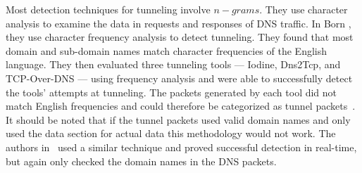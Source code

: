 Most detection techniques for tunneling involve $n-grams$.
They use character analysis to examine the data in requests and responses of DNS traffic.
In Born \etal{}, they use character frequency analysis to detect tunneling.
They found that most domain and sub-domain names match character frequencies of the English language.
They then evaluated three tunneling tools --- Iodine, Dns2Tcp, and TCP-Over-DNS --- using frequency
analysis and were able to successfully detect the tools' attempts at tunneling.
The packets generated by each tool did not match English frequencies and could therefore be
categorized as tunnel packets~\cite{tunnels}.
It should be noted that if the tunnel packets used valid domain names and only used the data section
for actual data this methodology would not work.
The authors in~\cite{bigram} used a similar technique and proved successful detection in real-time,
but again only checked the domain names in the DNS packets.
